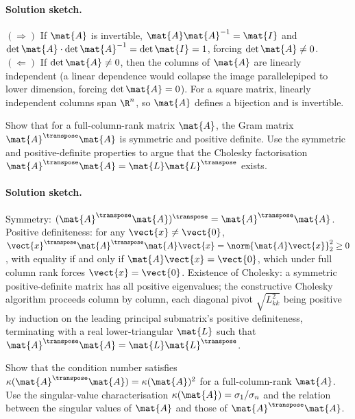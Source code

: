 \paragraph{Solution sketch.}
$(\Rightarrow)$ If $\mat{A}$ is invertible, $\mat{A}\mat{A}^{-1} =
\mat{I}$ and $\det \mat{A} \cdot \det \mat{A}^{-1} = \det \mat{I}
= 1$, forcing $\det \mat{A} \neq 0$. $(\Leftarrow)$ If $\det \mat{A}
\neq 0$, then the columns of $\mat{A}$ are linearly independent (a
linear dependence would collapse the image parallelepiped to lower
dimension, forcing $\det \mat{A} = 0$). For a square matrix,
linearly independent columns span $\R^{n}$, so $\mat{A}$ defines a
bijection and is invertible.

\begin{exercise}
Show that for a full-column-rank matrix $\mat{A}$, the Gram matrix
$\mat{A}^{\transpose}\mat{A}$ is symmetric and positive definite.
Use the symmetric and positive-definite properties to argue that
the Cholesky factorisation $\mat{A}^{\transpose}\mat{A} =
\mat{L}\mat{L}^{\transpose}$ exists.
\end{exercise}

\paragraph{Solution sketch.}
Symmetry: $(\mat{A}^{\transpose}\mat{A})^{\transpose} =
\mat{A}^{\transpose}\mat{A}$. Positive definiteness: for any
$\vect{x} \neq \vect{0}$, $\vect{x}^{\transpose}\mat{A}^{\transpose}
\mat{A}\vect{x} = \norm{\mat{A}\vect{x}}_{2}^{2} \geq 0$, with
equality if and only if $\mat{A}\vect{x} = \vect{0}$, which under
full column rank forces $\vect{x} = \vect{0}$. Existence of
Cholesky: a symmetric positive-definite matrix has all positive
eigenvalues; the constructive Cholesky algorithm proceeds column
by column, each diagonal pivot $\sqrt{L_{kk}^{2}}$ being positive
by induction on the leading principal submatrix's positive
definiteness, terminating with a real lower-triangular $\mat{L}$
such that $\mat{A}^{\transpose}\mat{A} = \mat{L}\mat{L}^{\transpose}$.

\begin{exercise}
Show that the condition number satisfies $\kappa(\mat{A}^{\transpose}
\mat{A}) = \kappa(\mat{A})^{2}$ for a full-column-rank $\mat{A}$.
Use the singular-value characterisation $\kappa(\mat{A}) =
\sigma_{1}/\sigma_{n}$ and the relation between the singular values
of $\mat{A}$ and those of $\mat{A}^{\transpose}\mat{A}$.
\end{exercise}


